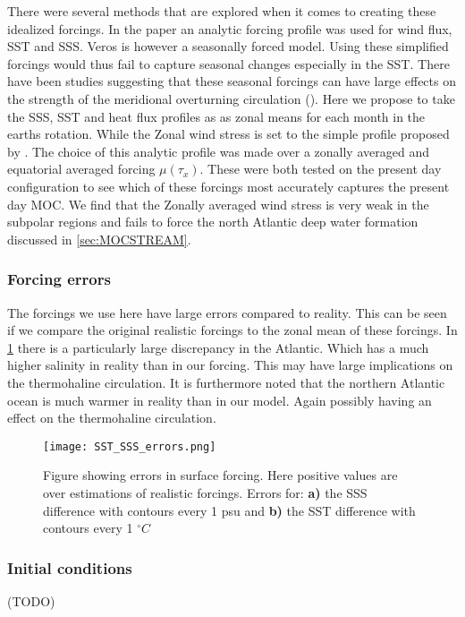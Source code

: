  There were several methods that are explored when it comes to creating these idealized forcings. In the \cite{Mulder2017Jul} paper an analytic forcing profile was used for wind flux, SST and SSS. Veros is however a seasonally forced model. Using these simplified forcings would thus fail to capture seasonal changes especially in the SST. There have been studies suggesting that these seasonal forcings can have large effects on the strength of the meridional overturning circulation (\cite{schmittner2001seasonally}). Here we propose to take the SSS, SST and heat flux profiles as as zonal means for each month in the earths rotation. While the Zonal wind stress is set to the simple profile proposed by \cite{bryan1987parameter}. The choice of this analytic profile was made over a zonally averaged and equatorial averaged forcing $\mu(\tau_x)$. These were both tested on the present day configuration to see which of these forcings most accurately captures the present day MOC. We find that the Zonally averaged wind stress is very weak in the subpolar regions and fails to force the north Atlantic deep water formation discussed in \cref{sec:MOCSTREAM}.
 
 \subsubsection{Forcing errors} \label{sec:forc_err}
The forcings we use here have large errors compared to reality. This can be seen if we compare the original realistic forcings to the zonal mean of these forcings. In \cref{fig:sss_sst_errors} there is a particularly large discrepancy in the Atlantic. Which has a much higher salinity in reality than in our forcing. This may have large implications on the thermohaline circulation. It is furthermore noted that the northern Atlantic ocean is much warmer in reality than in our model. Again possibly having an effect on the thermohaline circulation.

\begin{figure}[H]
	\texttt{[image: SST\_SSS\_errors.png]}
	\caption{Figure showing errors in surface forcing. Here positive values are over estimations of realistic forcings. Errors for: \textbf{a)} the SSS difference with contours every 1 psu and \textbf{b)} the SST difference with contours every 1 $^{\circ}C$}
	\label{fig:sss_sst_errors}
\end{figure}

 \subsubsection{Initial conditions}
 (TODO)
 
